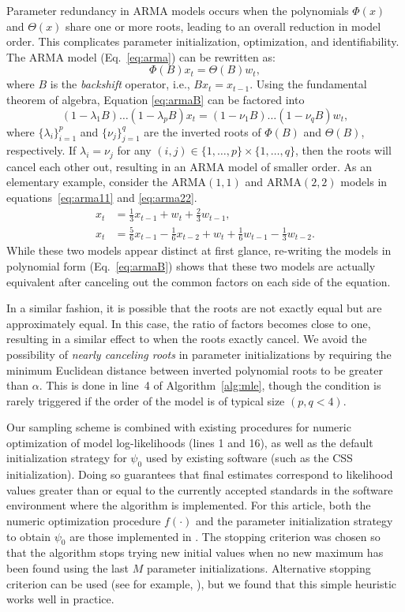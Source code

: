Parameter redundancy in ARMA models occurs when the polynomials $\Phi(x)$ and $\Theta(x)$ share one or more roots, leading to an overall reduction in model order.
This complicates parameter initialization, optimization, and identifiability.
The ARMA model (Eq.~\ref{eq:arma}) can be rewritten as:
\begin{equation}
  \Phi(B)x_t = \Theta(B)w_t, \label{eq:armaB}
\end{equation}
where $B$ is the \emph{backshift} operator, i.e., $Bx_t = x_{t - 1}$.
Using the fundamental theorem of algebra, Equation \ref{eq:armaB} can be factored into 
$$
(1 - \lambda_1B) \ldots (1 - \lambda_pB)x_t = (1 - \nu_1B) \ldots (1 - \nu_qB)w_t,
$$ 
where $\{\lambda_i\}_{i = 1}^p$ and $\{\nu_j\}_{j = 1}^q$ are the inverted roots of $\Phi(B)$ and $\Theta(B)$, respectively.
If $\lambda_i = \nu_j$ for any $(i, j) \in \{1, \ldots, p\} \times \{1, \ldots, q\}$, then the roots will cancel each other out, resulting in an ARMA model of smaller order.
As an elementary example, consider the $\text{ARMA}(1, 1)$ and $\text{ARMA}(2, 2)$ models in equations~\ref{eq:arma11} and \ref{eq:arma22}.
\begin{align}
  x_t &= \frac{1}{3}x_{t - 1} + w_t + \frac{2}{3}w_{t - 1}, \label{eq:arma11}\\
  x_t &= \frac{5}{6}x_{t - 1} - \frac{1}{6}x_{t - 2} + w_t + \frac{1}{6}w_{t - 1} - \frac{1}{3}w_{t - 2}. \label{eq:arma22}
\end{align}
While these two models appear distinct at first glance, re-writing the models in polynomial form (Eq.~\ref{eq:armaB}) shows that these two models are actually equivalent after canceling out the common factors on each side of the equation.

In a similar fashion, it is possible that the roots are not exactly equal but are approximately equal.
In this case, the ratio of factors becomes close to one, resulting in a similar effect to when the roots exactly cancel.
We avoid the possibility of \emph{nearly canceling roots} in parameter initializations by requiring the minimum Euclidean distance between inverted polynomial roots to be greater than $\alpha$.
This is done in line~4 of Algorithm~\ref{alg:mle}, though the condition is rarely triggered if the order of the model is of typical size $(p, q < 4)$.

Our sampling scheme is combined with existing procedures for numeric optimization of model log-likelihoods (lines 1 and 16), as well as the default initialization strategy for $\psi_0$ used by existing software (such as the CSS initialization).
Doing so guarantees that final estimates correspond to likelihood values greater than or equal to the currently accepted standards in the software environment where the algorithm is implemented.
For this article, both the numeric optimization procedure $f(\cdot)$ and the parameter initialization strategy to obtain $\psi_0$ are those implemented in .
The stopping criterion was chosen so that the algorithm stops trying new initial values when no new maximum has been found using the last $M$ parameter initializations.
Alternative stopping criterion can be used (see for example, \cite{hart98}), but we found that this simple heuristic works well in practice.

